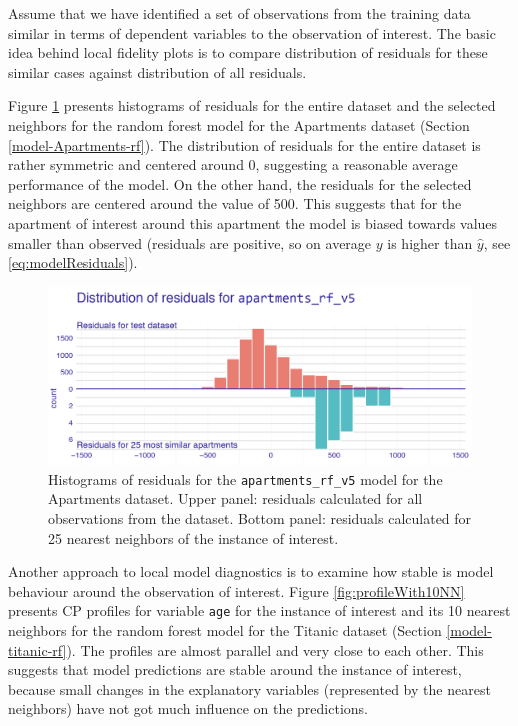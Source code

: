 \documentclass[]{krantz}
\begin{document}
Assume that we have identified a set of observations from the training data similar in terms of dependent variables to the observation of interest.
The basic idea behind local fidelity plots is to compare distribution of residuals for these similar cases against distribution of all residuals.

Figure \ref{fig:profileBack2BackHist} presents histograms of residuals for the entire dataset and the selected neighbors for the random forest model for the Apartments dataset (Section \ref{model-Apartments-rf}). The distribution of residuals for the entire dataset is rather symmetric and centered around 0, suggesting a reasonable average performance of the model. On the other hand, the residuals for the selected neighbors are centered around the value of 500. This suggests that for the apartment of interest around this apartment the model is biased towards values smaller than observed (residuals are positive, so on average \(y\) is higher than \(\hat y\), see \eqref{eq:modelResiduals}).



\begin{figure}

{\centering \includegraphics[width=0.8\linewidth]{figure/bb_hist} 

}

\caption{Histograms of residuals for the \texttt{apartments\_rf\_v5} model for the Apartments dataset. Upper panel: residuals calculated for all observations from the dataset. Bottom panel: residuals calculated for 25 nearest neighbors of the instance of interest.}\label{fig:profileBack2BackHist}
\end{figure}

Another approach to local model diagnostics is to examine how stable is model behaviour around the observation of interest.
Figure \ref{fig:profileWith10NN} presents CP profiles for variable \texttt{age} for the instance of interest and its 10 nearest neighbors for the random forest model for the Titanic dataset (Section \ref{model-titanic-rf}). The profiles are almost parallel and very close to each other. This suggests that model predictions are stable around the instance of interest, because small changes in the explanatory variables (represented by the nearest neighbors) have not got much influence on the predictions.
\end{document}
